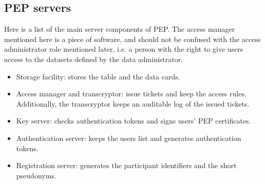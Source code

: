 \documentclass{report}
\begin{document}
\subsection{PEP servers}\label{pep_servers}
Here is a list of the main server components of PEP. The access manager mentioned here is a piece of software, and should not be confused with the access administrator role mentioned
later, i.e. a person with the right to give users access to the datasets defined by the data administrator.
\begin{itemize}
		\item Storage facility: stores the table and the data cards.
		\item Access manager and transcryptor: issue tickets and keep the access rules. Additionally, the transcryptor keeps an auditable log of the issued tickets.
		\item Key server: checks authentication tokens and signs users' PEP certificates.
		\item Authentication server: keeps the users list and generates authentication tokens. 
		\item Registration server: generates the participant identifiers and the short pseudonyms.
\end{itemize}
\end{document}
